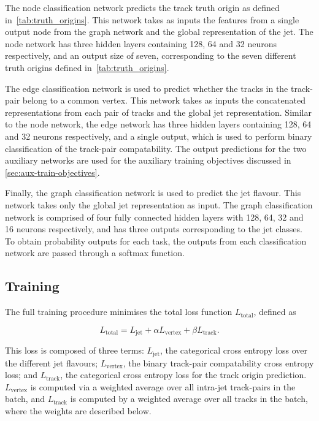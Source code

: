 The node classification network predicts the track truth origin as defined in~\cref{tab:truth_origins}.
This network takes as inputs the features from a single output node from the graph network and the global representation of the jet.
The node network has three hidden layers containing 128, 64 and 32 neurons respectively, and an output size of seven, corresponding to the seven different truth origins defined in~\cref{tab:truth_origins}.

The edge classification network is used to predict whether the tracks in the track-pair belong to a common vertex.
This network takes as inputs the concatenated representations from each pair of tracks and the global jet representation.
Similar to the node network, the edge network has three hidden layers containing 128, 64 and 32 neurons respectively, and a single output, which is used to perform binary classification of the track-pair compatability.
The output predictions for the two auxiliary networks are used for the auxiliary training objectives discussed in \cref{sec:aux-train-objectives}.

Finally, the graph classification network is used to predict the jet flavour.
This network takes only the global jet representation as input.
The graph classification network is comprised of four fully connected hidden layers with 128, 64, 32 and 16 neurons respectively, and has three outputs corresponding to the \bcl jet classes.
To obtain probability outputs for each task, the outputs from each classification network are passed through a softmax function.


\subsection{Training}\label{sec:training}

The full \GNN training procedure minimises the total loss function $L_\text{total}$, defined as 

\begin{equation}\label{eq:loss}
    L_\text{total} = L_\text{jet} + \alpha L_\text{vertex} + \beta L_\text{track}.
\end{equation}

This loss is composed of three terms: $L_\text{jet}$, the categorical cross entropy loss over the different jet flavours; $L_\text{vertex}$, the binary track-pair compatability cross entropy loss; and $L_\text{track}$, the categorical cross entropy loss for the track origin prediction.
$L_\text{vertex}$ is computed via a weighted average over all intra-jet track-pairs in the batch, and $L_\text{track}$ is computed by a weighted average over all tracks in the batch, where the weights are described below.



